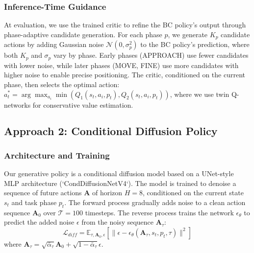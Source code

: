 \documentclass[conference]{IEEEtran}
\begin{document}
\subsubsection{Inference-Time Guidance}
At evaluation, we use the trained critic to refine the BC policy's output through phase-adaptive candidate generation. For each phase $p$, we generate $K_p$ candidate actions by adding Gaussian noise $\mathcal{N}(0, \sigma_p^2)$ to the BC policy's prediction, where both $K_p$ and $\sigma_p$ vary by phase. Early phases (APPROACH) use fewer candidates with lower noise, while later phases (MOVE, FINE) use more candidates with higher noise to enable precise positioning. The critic, conditioned on the current phase, then selects the optimal action: $a_t^* = \arg\max_{a_i} \min(Q_1(s_t, a_i, p_t), Q_2(s_t, a_i, p_t))$, where we use twin Q-networks for conservative value estimation.

\subsection{Approach 2: Conditional Diffusion Policy}

\subsubsection{Architecture and Training}
Our generative policy is a conditional diffusion model based on a UNet-style MLP architecture (`CondDiffusionNetV4`). The model is trained to denoise a sequence of future actions $\mathbf{A}$ of horizon $H=8$, conditioned on the current state $s_t$ and task phase $p_t$. The forward process gradually adds noise to a clean action sequence $\mathbf{A}_0$ over $\mathcal{T}=100$ timesteps. The reverse process trains the network $\epsilon_\theta$ to predict the added noise $\epsilon$ from the noisy sequence $\mathbf{A}_\tau$:
\begin{equation}
    \mathcal{L}_{diff} = \mathbb{E}_{\tau, \mathbf{A}_0, \epsilon} [\| \epsilon - \epsilon_\theta(\mathbf{A}_\tau, s_t, p_t, \tau) \|^2]
\end{equation}
where $\mathbf{A}_\tau = \sqrt{\bar{\alpha}_\tau}\mathbf{A}_0 + \sqrt{1-\bar{\alpha}_\tau}\epsilon$.
\end{document}
